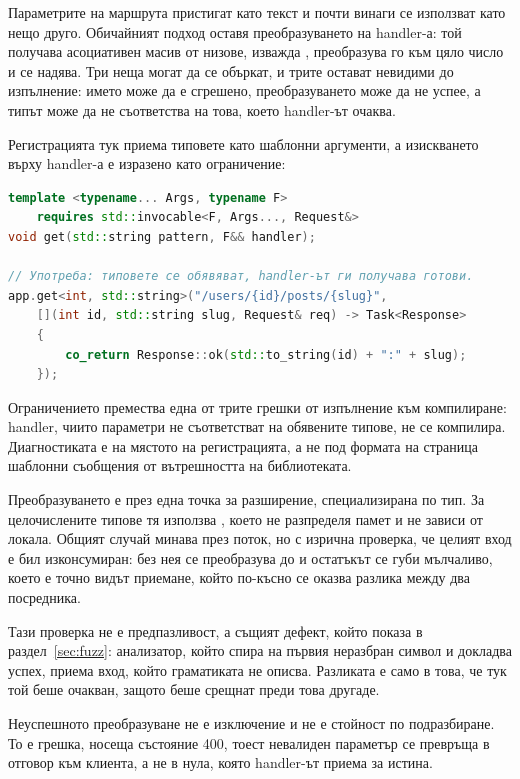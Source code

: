 Параметрите на маршрута пристигат като текст и почти винаги се използват като нещо друго.
Обичайният подход оставя преобразуването на handler-а: той получава асоциативен масив от
низове, изважда , преобразува го към цяло число и се надява. Три неща могат да се
объркат, и трите остават невидими до изпълнение: името може да е сгрешено, преобразуването
може да не успее, а типът може да не съответства на това, което handler-ът очаква.

Регистрацията тук приема типовете като шаблонни аргументи, а изискването върху handler-а е
изразено като ограничение:

\begin{lstlisting}[language=C++,caption={Регистрация с обявени типове на параметрите},label={lst:typed}]
template <typename... Args, typename F>
    requires std::invocable<F, Args..., Request&>
void get(std::string pattern, F&& handler);

// Употреба: типовете се обявяват, handler-ът ги получава готови.
app.get<int, std::string>("/users/{id}/posts/{slug}",
    [](int id, std::string slug, Request& req) -> Task<Response>
    {
        co_return Response::ok(std::to_string(id) + ":" + slug);
    });
\end{lstlisting}

Ограничението  премества една от трите грешки от изпълнение към
компилиране: handler, чиито параметри не съответстват на обявените типове, не се компилира.
Диагностиката е на мястото на регистрацията, а не под формата на страница шаблонни
съобщения от вътрешността на библиотеката.

Преобразуването е през една точка за разширение, специализирана по тип. За целочислените
типове тя използва , което не разпределя памет и не зависи от
локала. Общият случай минава през поток, но с изрична проверка, че целият вход е бил
изконсумиран: без нея  се преобразува до  и остатъкът се губи мълчаливо,
което е точно видът приемане, който по-късно се оказва разлика между два посредника.

Тази проверка не е предпазливост, а същият дефект, който  показа в
раздел~\ref{sec:fuzz}: анализатор, който спира на първия неразбран символ и докладва успех,
приема вход, който граматиката не описва. Разликата е само в това, че тук той беше очакван,
защото беше срещнат преди това другаде.

Неуспешното преобразуване не е изключение и не е стойност по подразбиране. То е грешка,
носеща състояние 400, тоест невалиден параметър се превръща в отговор към клиента, а не в
нула, която handler-ът приема за истина.

